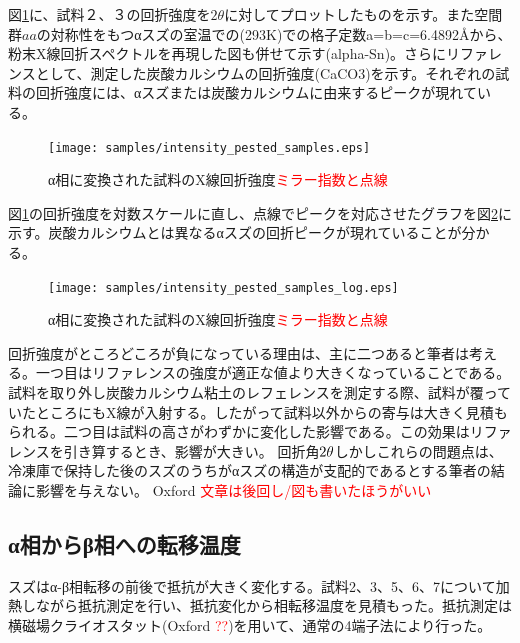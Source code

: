 図\ref{fig:intensity_pested_samples}に、試料２、３の回折強度を$2\theta$に対してプロットしたものを示す。また空間群$aa$の対称性をもつαスズの室温での(293K)での格子定数a=b=c=6.4892\AA \cite{THEWLIS}から、粉末X線回折スペクトルを再現した図も併せて示す(alpha-Sn)。さらにリファレンスとして、測定した炭酸カルシウムの回折強度(CaCO3)を示す。それぞれの試料の回折強度には、αスズまたは炭酸カルシウムに由来するピークが現れている。
\begin{figure}[!h]
  \begin{center}
  \texttt{[image: samples/intensity\_pested\_samples.eps]}
  \end{center}
  \caption{α相に変換された試料のX線回折強度\textcolor{red}{ミラー指数と点線}}
  \label{fig:intensity_pested_samples}
\end{figure}

図\ref{fig:intensity_pested_samples}の回折強度を対数スケールに直し、点線でピークを対応させたグラフを図\ref{fig:intensity_pested_samples_log}に示す。炭酸カルシウムとは異なるαスズの回折ピークが現れていることが分かる。%
\begin{figure}[!h]
  \begin{center}
  \texttt{[image: samples/intensity\_pested\_samples\_log.eps]}
  \end{center}
  \caption{α相に変換された試料のX線回折強度\textcolor{red}{ミラー指数と点線}}
  \label{fig:intensity_pested_samples_log}
\end{figure}


回折強度がところどころが負になっている理由は、主に二つあると筆者は考える。一つ目はリファレンスの強度が適正な値より大きくなっていることである。試料を取り外し炭酸カルシウム粘土のレフェレンスを測定する際、試料が覆っていたところにもX線が入射する。したがって試料以外からの寄与は大きく見積もられる。二つ目は試料の高さがわずかに変化した影響である。この効果はリファレンスを引き算するとき、影響が大きい。
回折角$\rm 2\theta$しかしこれらの問題点は、冷凍庫で保持した後のスズのうちがαスズの構造が支配的であるとする筆者の結論に影響を与えない。
Oxford \textcolor{red}{文章は後回し/図も書いたほうがいい}


\subsection{α相からβ相への転移温度}
スズはα-β相転移の前後で抵抗が大きく変化する。試料2、3、5、6、7について加熱しながら抵抗測定を行い、抵抗変化から相転移温度を見積もった。抵抗測定は横磁場クライオスタット(Oxford \textcolor{red}{??})を用いて、通常の4端子法により行った。


